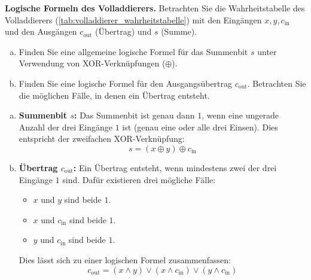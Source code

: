 \begin{myexercise}\label{myexercise:volladdierer-formel}
    \textbf{Logische Formeln des Volladdierers.}
    Betrachten Sie die Wahrheitstabelle des Volladdierers (\cref{tab:volladdierer_wahrheitstabelle}) mit den Eingängen $x, y, c_{\text{in}}$ und den Ausgängen $c_{\text{out}}$ (Übertrag) und $s$ (Summe).
    \begin{enumerate}[(a)]
        \item Finden Sie eine allgemeine logische Formel für das Summenbit $s$ unter Verwendung von XOR-Verknüpfungen ($\oplus$).
        \item Finden Sie eine logische Formel für den Ausgangsübertrag $c_{\text{out}}$. Betrachten Sie die möglichen Fälle, in denen ein Übertrag entsteht.
    \end{enumerate}
    \begin{myanswer}
        \begin{enumerate}[(a)]
            \item \textbf{Summenbit $s$:}
            Das Summenbit ist genau dann $1$, wenn eine ungerade Anzahl der drei Eingänge $1$ ist (genau eine oder alle drei Einsen). Dies entspricht der zweifachen XOR-Verknüpfung:
            \[
                s = (x \oplus y) \oplus c_{\text{in}}
            \]
            \item \textbf{Übertrag $c_{\text{out}}$:}
            Ein Übertrag entsteht, wenn mindestens zwei der drei Eingänge $1$ sind. Dafür existieren drei mögliche Fälle:
            \begin{itemize}
                \item $x$ und $y$ sind beide $1$.
                \item $x$ und $c_{\text{in}}$ sind beide $1$.
                \item $y$ und $c_{\text{in}}$ sind beide $1$.
            \end{itemize}
            Dies lässt sich zu einer logischen Formel zusammenfassen:
            \[
                c_{\text{out}} = (x \land y) \lor (x \land c_{\text{in}}) \lor (y \land c_{\text{in}})
            \]
        \end{enumerate}
    \end{myanswer}
\end{myexercise}

